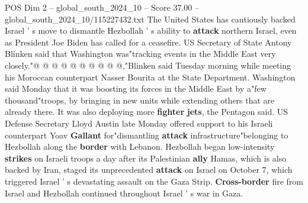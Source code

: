 \begin{textsample}{POS Dim 2 – global\_south\_2024\_10 – Score 37.00 – global\_south\_2024\_10/115227432.txt}
The United States has cautiously backed Israel ' s move to dismantle Hezbollah ' s ability to \textbf{attack} northern Israel, even as President Joe Biden has called for a ceasefire.
US Secretary of State Antony Blinken said that Washington was"tracking events in the Middle East very closely."@ @ @ @ @ @ @ @ @ @,"Blinken said Tuesday morning while meeting his Moroccan counterpart Nasser Bourita at the State Department.
Washington said Monday that it was boosting its forces in the Middle East by a"few thousand"troops, by bringing in new units while extending others that are already there.
It was also deploying more \textbf{fighter} \textbf{jets}, the Pentagon said.
US Defense Secretary Lloyd Austin late Monday offered support to his Israeli counterpart Yoav \textbf{Gallant} for"dismantling \textbf{attack} infrastructure"belonging to Hezbollah along the \textbf{border} with Lebanon.
Hezbollah began low-intensity \textbf{strikes} on Israeli troops a day after its Palestinian \textbf{ally} Hamas, which is also backed by Iran, staged its unprecedented \textbf{attack} on Israel on October 7, which triggered Israel ' s devastating assault on the Gaza Strip. \textbf{Cross-border} fire from Israel and Hezbollah continued throughout Israel ' s war in Gaza.

\end{textsample}
